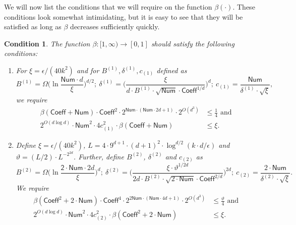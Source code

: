 \documentclass[11pt]{article}
\numberwithin{equation}{section}
\theoremstyle{definition}
\theoremstyle{plain}
\newtheorem{cond}[theorem]{Condition}
\begin{document}
We will now list the conditions that we will require on the function $\beta(\cdot)$.
These conditions look somewhat intimidating, but it is easy to see that they
will be satisfied as long as $\beta$ decreases sufficiently quickly.
\begin{cond}\label{cond:enforce-beta}
The function $\beta: [1, \infty) \rightarrow [0,1]$ should satisfy the following conditions: 
\begin{enumerate}
\item For $\xi = {\epsilon}/{(40k^2)}$ and 
for $B^{(1)}, \delta^{(1)}, c_{(1)}$ defined as \[
B^{(1)} = \Omega\bigg( \ln  \frac{\mathsf{Num} \cdot d}{\xi} \bigg)^{d/2} ;  \ \delta^{(1)} = \bigg( \frac{\xi}{d \cdot B^{(1)} \cdot \sqrt{\mathsf{Num}} \cdot \mathsf{Coeff}^{1/d}} \bigg)^d; \   c_{(1)} = \frac{\mathsf{Num}}{\delta^{(1)} \cdot \sqrt{\xi}},
\]
we  require
\begin{align*}
    \beta(\mathsf{Coeff} + \mathsf{Num}) \cdot \mathsf{Coeff}^2 \cdot 2^{\mathsf{Num} \cdot (\mathsf{Num}\cdot 2d+1)} \cdot 2^{O(d^3)} &\leq \frac{1}{4} \text{ and }\\
    2^{O(d \log d)} \cdot \mathsf{Num}^2 \cdot 4c_{(1)}^{2} \cdot \beta(\mathsf{Coeff} + \mathsf{Num}) &\le \xi.
\end{align*}
\item Define  $\xi = {\epsilon}/{(40k^2)}$, $L = 4 \cdot 9^{d+1} \cdot
    (d+1)^2 \cdot \log^{d/2} (k \cdot d/\epsilon) $ and $\vartheta = ({L}/{2}) \cdot
    L^{-2^{2d}}$. Further,  define $B^{(2)}$, $\delta^{(2)}$
    and $c_{(2)}$ as
\[
B^{(2)} = \Omega\bigg( \ln  \frac{\mathsf{2\cdot Num} \cdot 2d}{\xi} \bigg)^{d} ;  \ \delta^{(2)} = \bigg( \frac{\xi \cdot \vartheta^{1/2d}}{2d \cdot B^{(2)} \cdot \sqrt{2 \cdot \mathsf{Num}} \cdot \mathsf{Coeff}^{2/d}} \bigg)^{2d}; \   c_{(2)} = \frac{2 \cdot \mathsf{Num}}{\delta^{(2)} \cdot \sqrt{\xi}}.
\]
We require
\begin{align*}
    \beta(\mathsf{Coeff}^2 + 2 \cdot \mathsf{Num}) \cdot \mathsf{Coeff}^4 \cdot 2^{2\mathsf{Num} \cdot (\mathsf{Num}\cdot 4d+1)} \cdot 2^{O(d^3)} &\leq \frac{\vartheta}{4} \text{ and } \\
    2^{O(d \log d)} \cdot \mathsf{Num}^2 \cdot 4c_{(2)}^{2} \cdot \beta(\mathsf{Coeff}^2 + 2 \cdot \mathsf{Num}) &\le \xi.
 \end{align*}
\end{enumerate}
\end{cond}
\end{document}
